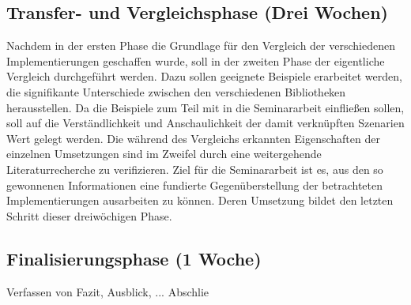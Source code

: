 \documentclass{article}
\begin{document}
\subsection{Transfer- und Vergleichsphase (Drei Wochen)}
Nachdem in der ersten Phase die Grundlage für den Vergleich der verschiedenen Implementierungen geschaffen wurde, soll in der zweiten Phase der eigentliche Vergleich durchgeführt werden.
Dazu sollen geeignete Beispiele erarbeitet werden, die signifikante Unterschiede zwischen den verschiedenen Bibliotheken herausstellen.
Da die Beispiele zum Teil mit in die Seminararbeit einfließen sollen, soll auf die Verständlichkeit und Anschaulichkeit der damit verknüpften Szenarien Wert gelegt werden.
Die während des Vergleichs erkannten Eigenschaften der einzelnen Umsetzungen sind im Zweifel durch eine weitergehende Literaturrecherche zu verifizieren.
Ziel für die Seminararbeit ist es, aus den so gewonnenen Informationen eine fundierte Gegenüberstellung der betrachteten Implementierungen ausarbeiten zu können.
Deren Umsetzung bildet den letzten Schritt dieser dreiwöchigen Phase.

\subsection{Finalisierungsphase (1 Woche)}
Verfassen von Fazit, Ausblick, ...
Abschlie%
\newpage
\nocite{*}


\end{document}
